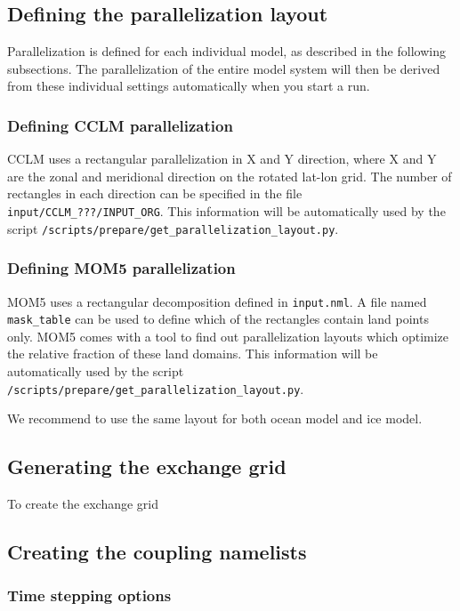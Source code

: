 \documentclass[a4paper,titlepage]{scrartcl}
\begin{document}
\subsection{Defining the parallelization layout}
Parallelization is defined for each individual model, as described in the following subsections.
The parallelization of the entire model system will then be derived from these individual settings automatically when you start a run.

\subsubsection{Defining CCLM parallelization}
CCLM uses a rectangular parallelization in X and Y direction, where X and Y are the zonal and meridional direction on the rotated lat-lon grid. 
The number of rectangles in each direction can be specified in the file \texttt{input/CCLM\_\color{red}???\color{black}/INPUT\_ORG}.
This information will be automatically used by the script \texttt{/scripts/prepare/get\_parallelization\_layout.py}.


\subsubsection{Defining MOM5 parallelization}
MOM5 uses a rectangular decomposition defined in \texttt{input.nml}. 
A file named \texttt{mask\_table} can be used to define which of the rectangles contain land points only.
MOM5 comes with a tool to find out parallelization layouts which optimize the relative fraction of these land domains.
This information will be automatically used by the script \texttt{/scripts/prepare/get\_parallelization\_layout.py}.

We recommend to use the same layout for both ocean model and ice model.


\subsection{Generating the exchange grid}
To create the exchange grid

\subsection{Creating the coupling namelists}

\subsubsection{Time stepping options}
\end{document}

